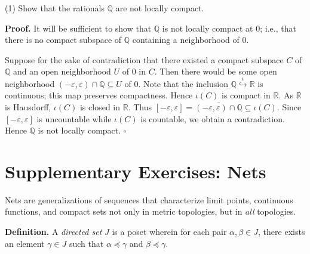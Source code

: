 \documentclass[a4paper]{article}
\newcommand{\R}{\mathbb{R}}
\newcommand{\Q}{\mathbb{Q}}
\begin{document}
(1) Show that the rationals $\Q$ are not locally compact.

\textbf{Proof.} It will be sufficient to show that $\Q$ is not locally compact at $0$; i.e., that there is no compact subspace of $\Q$ containing a neighborhood of $0$.

Suppose for the sake of contradiction that there existed a compact subspace $C$ of $\Q$ and an open neighborhood $U$ of $0$ in $C$. Then there would be some open neighborhood $(-\varepsilon, \varepsilon) \cap \Q \subseteq U$ of $0$. Note that the inclusion $\Q \overset{\iota}{\hookrightarrow} \R$ is continuous; this map preserves compactness. Hence $\iota(C)$ is compact in $\R$. As $\R$ is Hausdorff, $\iota(C)$ is closed in $\R$. Thus $[-\varepsilon, \varepsilon] = \overline{(-\varepsilon, \varepsilon) \cap \Q} \subseteq \iota(C)$. Since $[-\varepsilon, \varepsilon]$ is uncountable while $\iota(C)$ is countable, we obtain a contradiction. Hence $\Q$ is not locally compact. $\square$

\section*{Supplementary Exercises: Nets}

Nets are generalizations of sequences that characterize limit points, continuous functions, and compact sets not only in metric topologies, but in \emph{all} topologies.

\textbf{Definition.} A \emph{directed set} $J$ is a poset wherein for each pair $\alpha, \beta \in J$, there exists an element $\gamma \in J$ such that $\alpha \preceq \gamma$ and $\beta \preceq \gamma$.
\end{document}
